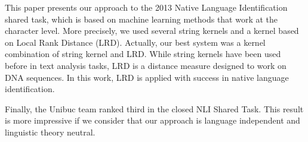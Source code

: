 This paper presents our approach to the 2013 Native Language Identification shared task, which is based on machine learning methods that work at the
 character level. More precisely, we used several string kernels and a kernel
 based on Local Rank Distance (LRD). Actually, our best system was a kernel
 combination of string kernel and LRD. While string kernels have been used
 before in text analysis tasks, LRD is a distance measure designed to work on
 DNA sequences. In this work, LRD is applied with success in native language
 identification.
 
 Finally, the Unibuc team ranked third in the closed NLI Shared Task. This
 result is more impressive if we consider that our approach is language
 independent and linguistic theory neutral.

